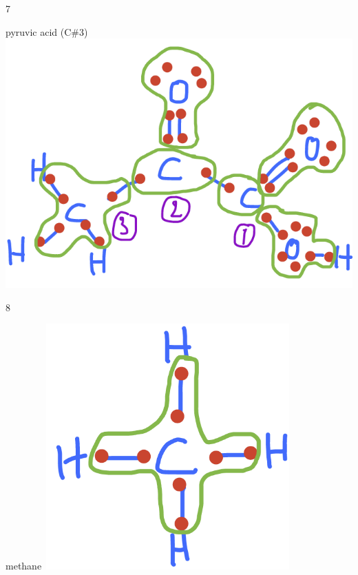 \documentclass[]{book}
\theoremstyle{definition}
\theoremstyle{definition}
\theoremstyle{definition}
\theoremstyle{remark}
\begin{document}
7

pyruvic acid
(C\#3)~\includegraphics{pictures/ElecAlloc_pyruvic_acid.png}

8

methane~\includegraphics[width=0.70000\textwidth]{pictures/ElecAlloc_CH4.png}
\end{document}
